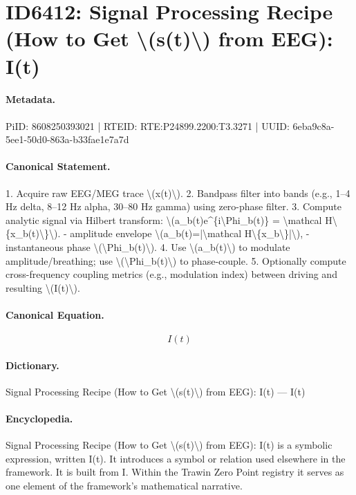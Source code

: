 \section*{ID6412: Signal Processing Recipe (How to Get \textbackslash{}(s(t)\textbackslash{}) from EEG): I(t)}
\paragraph{Metadata.}
PiID: 8608250393021 | RTEID: RTE:P24899.2200:T3.3271 | UUID: 6eba9c8a-5ee1-50d0-863a-b33fae1e7a7d

\paragraph{Canonical Statement.}
1. Acquire raw EEG/MEG trace \textbackslash{}(x(t)\textbackslash{}). 2. Bandpass filter into bands (e.g., 1–4 Hz delta, 8–12 Hz alpha, 30–80 Hz gamma) using zero-phase filter. 3. Compute analytic signal via Hilbert transform: \textbackslash{}(a\_b(t)e\textasciicircum{}\{i\textbackslash{}Phi\_b(t)\} = \textbackslash{}mathcal H\textbackslash{}\{x\_b(t)\textbackslash{}\}\textbackslash{}). - amplitude envelope \textbackslash{}(a\_b(t)=|\textbackslash{}mathcal H\textbackslash{}\{x\_b\textbackslash{}\}|\textbackslash{}), - instantaneous phase \textbackslash{}(\textbackslash{}Phi\_b(t)\textbackslash{}). 4. Use \textbackslash{}(a\_b(t)\textbackslash{}) to modulate amplitude/breathing; use \textbackslash{}(\textbackslash{}Phi\_b(t)\textbackslash{}) to phase-couple. 5. Optionally compute cross-frequency coupling metrics (e.g., modulation index) between driving and resulting \textbackslash{}(I(t)\textbackslash{}).

\paragraph{Canonical Equation.}
\[
I(t)
\]

\paragraph{Dictionary.}
Signal Processing Recipe (How to Get \textbackslash{}(s(t)\textbackslash{}) from EEG): I(t) — I(t)

\paragraph{Encyclopedia.}
Signal Processing Recipe (How to Get \textbackslash{}(s(t)\textbackslash{}) from EEG): I(t) is a symbolic expression, written I(t). It introduces a symbol or relation used elsewhere in the framework. It is built from I. Within the Trawin Zero Point registry it serves as one element of the framework's mathematical narrative.
